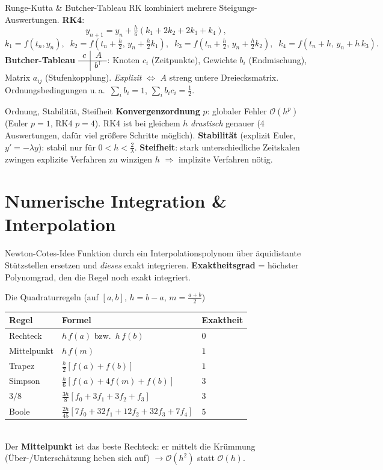 \documentclass[a4paper,11pt]{article}
\begin{document}
\begin{satz}{Runge-Kutta \& Butcher-Tableau}
RK kombiniert mehrere Steigungs-Auswertungen. \textbf{RK4}:
\[
  y_{n+1}=y_n+\tfrac h6(k_1+2k_2+2k_3+k_4),
\]
\[
  k_1=f(t_n,y_n),\;\; k_2=f(t_n{+}\tfrac h2,\,y_n{+}\tfrac h2 k_1),\;\;
  k_3=f(t_n{+}\tfrac h2,\,y_n{+}\tfrac h2 k_2),\;\; k_4=f(t_n{+}h,\,y_n{+}h\,k_3).
\]
\textbf{Butcher-Tableau} $\begin{array}{c|c}c&A\\\hline&b^{\!\top}\end{array}$:
Knoten $c_i$ (Zeitpunkte), Gewichte $b_i$ (Endmischung), Matrix $a_{ij}$ (Stufenkopplung).
\emph{Explizit} $\Leftrightarrow$ $A$ streng untere Dreiecksmatrix. Ordnungsbedingungen u.\,a.\
$\sum_i b_i=1$, $\sum_i b_i c_i=\tfrac12$.
\end{satz}

\begin{intu}{Ordnung, Stabilität, Steifheit}
\textbf{Konvergenzordnung} $p$: globaler Fehler $\mathcal O(h^p)$ (Euler $p{=}1$, RK4 $p{=}4$). RK4
ist bei gleichem $h$ \emph{drastisch} genauer (4 Auswertungen, dafür viel größere Schritte möglich).
\textbf{Stabilität} (explizit Euler, $y'=-\lambda y$): stabil nur für $0<h<\tfrac{2}{\lambda}$.
\textbf{Steifheit}: stark unterschiedliche Zeitskalen zwingen explizite Verfahren zu winzigen $h$
$\Rightarrow$ implizite Verfahren nötig.
\end{intu}

\section{Numerische Integration \& Interpolation}

\begin{defi}{Newton-Cotes-Idee}
Funktion durch ein Interpolationspolynom über äquidistante Stützstellen ersetzen und \emph{dieses}
exakt integrieren. \textbf{Exaktheitsgrad} = höchster Polynomgrad, den die Regel noch exakt
integriert.
\end{defi}

\begin{satz}{Die Quadraturregeln (auf $[a,b]$, $h=b-a$, $m=\tfrac{a+b}{2}$)}
\renewcommand{\arraystretch}{1.25}
\begin{tabular}{@{}lll@{}}
Regel & Formel & Exaktheit\\\hline
Rechteck & $h\,f(a)$ bzw.\ $h\,f(b)$ & $0$\\
Mittelpunkt & $h\,f(m)$ & $1$\\
Trapez & $\tfrac h2[f(a)+f(b)]$ & $1$\\
Simpson & $\tfrac h6[f(a)+4f(m)+f(b)]$ & $3$\\
$3/8$ & $\tfrac{3h}{8}[f_0+3f_1+3f_2+f_3]$ & $3$\\
Boole & $\tfrac{2h}{45}[7f_0+32f_1+12f_2+32f_3+7f_4]$ & $5$\\
\end{tabular}\\[2pt]
Der \textbf{Mittelpunkt} ist das beste Rechteck: er mittelt die Krümmung (Über-/Unterschätzung
heben sich auf) $\to\mathcal O(h^2)$ statt $\mathcal O(h)$.
\end{satz}
\end{document}

